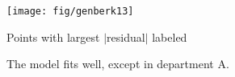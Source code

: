 \begin{frame}
\begin{center}
  \texttt{[image: fig/genberk13]}
\end{center}
\begin{itemize*}
\item Points with largest $|$residual$|$ labeled
\item The model fits well, except in department A.
\end{itemize*}

\end{frame}

\endinput
\begin{frame}
  \frametitle{}
  \begin{itemize}
	\item{\large\bfseries }
      \begin{itemize*}
	  \item 
    	\begin{itemize*}
		\item 
		\item 
		\end{itemize*}
	  \item 
	  \end{itemize*}
	\item{\large\bfseries }
	\item{\large\bfseries }
  \end{itemize}
\end{frame}

